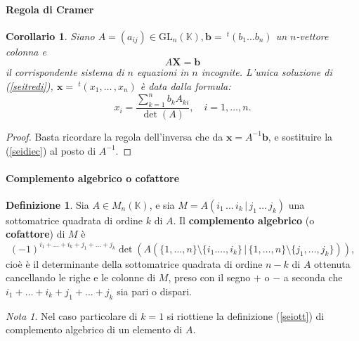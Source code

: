 \documentclass{article}
\theoremstyle{plain}
\newtheorem{cor}{Corollario}
\theoremstyle{definition}
\newtheorem{defn}{Definizione}[section]
\theoremstyle{remark}
\newtheorem{note}{Nota}
\begin{document}
\paragraph{Regola di Cramer}
\begin{bxthm}
\begin{cor}
    Siano $A=(a_{ij})\in\mathrm{GL}_n(\mathbb{K}), \mathbf{b}=\ ^t(b_1\ldots b_n)$ un $n$-vettore colonna e 
    \begin{equation}
        A\mathbf{X}=\mathbf{b}\label{seitredi}
    \end{equation}
    il corrispondente sistema di $n$ equazioni in $n$ incognite. 
    L'unica soluzione di (\ref{seitredi}), $\mathbf{x}=\ ^t(x_1,\ldots\,,x_n)$ è data dalla formula: 
    \begin{equation}
        x_i=\dfrac{\sum\limits_{k=1}^{n}b_k A_{ki}}{\det(A)},\quad i=1,\ldots,n. \label{seiquattordi}
    \end{equation}
\end{cor}
\end{bxthm}
\begin{proof}
    Basta ricordare la regola dell'inversa che da $\mathbf{x}=A^{-1}\mathbf{b}$, e sostituire la (\ref{seidiec}) al posto di $A^{-1}$.
\end{proof}

\vspace{10pt}

\paragraph{Complemento algebrico o cofattore}
\begin{bxthm}
\begin{defn}
    Sia $A\in M_n(\mathbb{K})$, e sia $M=A(i_1\,\ldots\, i_k\,|\,j_1\,\ldots\,j_k)$ una sottomatrice quadrata di ordine $k$ di $A$. Il \textbf{complemento algebrico} (o \textbf{cofattore}) di $M$ è 
    \[(-1)^{i_1+\ldots+i_k+j_1+\ldots+j_k}\det(A(\{1,\ldots,n\}\setminus\{i_1.\ldots,i_k\}\,|\,\{1,\ldots,n\}\setminus\{j_1,\ldots,j_k\})),\]
    cioè è il determinante della sottomatrice quadrata di ordine $n-k$ di $A$ ottenuta cancellando le righe e le colonne di $M$, preso con il segno $+$ o $-$ a seconda che $i_1+\ldots+i_k+j_1+\ldots+j_k$ sia pari o dispari.
\end{defn}
\end{bxthm}

\vspace{10pt}

\begin{note}
    Nel caso particolare di $k=1$ si riottiene la definizione (\ref{seiott}) di complemento algebrico di un elemento di $A$.
\end{note}
\end{document}
